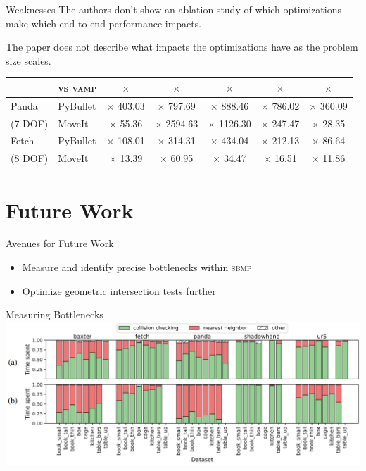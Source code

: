 \documentclass{beamer}
\begin{document}
\begin{frame}{Weaknesses}
The authors don't show an ablation study of which optimizations make which end-to-end performance impacts.
\vspace{5px}\pause

The paper does not describe what impacts the optimizations have as the problem size scales. 

\begin{table}[width=0.8\textwidth]

\centering
  \begin{tabular}{ll*{5}{@{\hspace{4pt}} >{$\times$} S}}
  \toprule
        & vs \textsc{vamp} &  &  &  &  &  \\
  \midrule
  Panda & PyBullet & 403.03 & 797.69  & 888.46   & 786.02 & 360.09 \\
  (7 DOF) & MoveIt  & 55.36  & 2594.63 & 1126.30  & 247.47 & 28.35  \\
  \midrule
  Fetch & PyBullet & 108.01 & 314.31  & 434.04   & 212.13 & 86.64  \\
  (8 DOF) & MoveIt   & 13.39  & 60.95   & 34.47    & 16.51  & 11.86  \\
  \bottomrule
\end{tabular}
\end{table}

\end{frame}

\section{Future Work}

\begin{frame}{Avenues for Future Work}
\begin{itemize}
\item Measure and identify precise bottlenecks within \textsc{sbmp}
\item Optimize geometric intersection tests further
\end{itemize}

\end{frame}

\begin{frame}{Measuring Bottlenecks}
\includegraphics[width=\textwidth]{./assets/cc_nn_zoom.png}
\end{frame}
\end{document}
